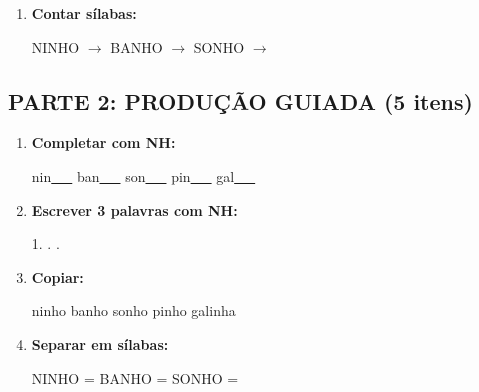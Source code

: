 \begin{exercicio}
\begin{enumerate}
  \item \textbf{Contar sílabas:}
  \begin{center}
  NINHO $\rightarrow$ \underline{\hspace{0.9cm}} \quad BANHO $\rightarrow$ \underline{\hspace{0.9cm}} \quad SONHO $\rightarrow$ \underline{\hspace{0.9cm}}
  \end{center}

\end{enumerate}

\subsection*{PARTE 2: PRODUÇÃO GUIADA (5 itens)}

\begin{enumerate}[resume]

  \item \textbf{Completar com NH:}
  \begin{center}
  nin\underline{~~~} \quad ban\underline{~~~} \quad son\underline{~~~} \quad pin\underline{~~~} \quad gal\underline{~~~}
  \end{center}

  \item \textbf{Escrever 3 palavras com NH:}
  \begin{center}
  1. \underline{\hspace{3cm}} . \underline{\hspace{3cm}} . \underline{\hspace{3cm}}
  \end{center}

  \item \textbf{Copiar:}
  \begin{center}
  ninho \quad banho \quad sonho \quad pinho \quad galinha
  \end{center}

  \item \textbf{Separar em sílabas:}
  \begin{center}
  NINHO = \underline{\hspace{1cm}} \underline{\hspace{1cm}} \quad BANHO = \underline{\hspace{1cm}} \underline{\hspace{1cm}} \quad SONHO = \underline{\hspace{1cm}} \underline{\hspace{1cm}}
  \end{center}


\end{enumerate}
\end{exercicio}
